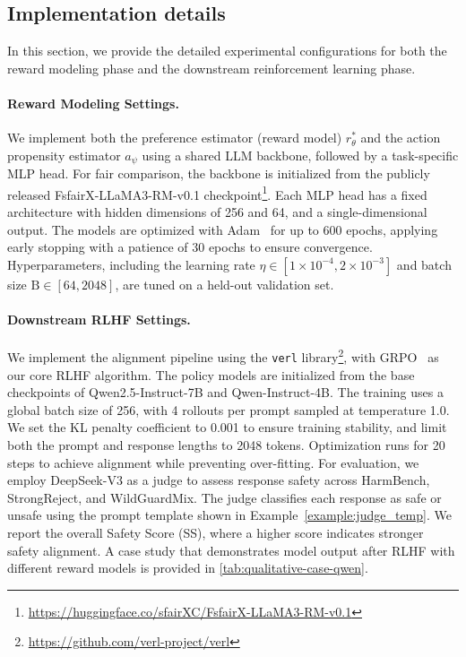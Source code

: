 \documentclass[]{arxiv_singlecolumn}
\theoremstyle{plain}
\theoremstyle{definition}
\theoremstyle{remark}
\begin{document}
\subsection{Implementation details}
\label{sec:appendix_implementation}



In this section, we provide the detailed experimental configurations for both the reward modeling phase and the downstream reinforcement learning phase.

\paragraph{Reward Modeling Settings.}
We implement both the preference estimator (reward model) $r^*_\theta$ and the action propensity estimator $\hat{a}_\psi$ using a shared LLM backbone, followed by a task-specific MLP head. For fair comparison, the backbone is initialized from the publicly released FsfairX-LLaMA3-RM-v0.1 checkpoint\footnote{\scriptsize\url{https://huggingface.co/sfairXC/FsfairX-LLaMA3-RM-v0.1}}. Each MLP head has a fixed architecture with hidden dimensions of 256 and 64, and a single-dimensional output. The models are optimized with Adam~\citep{adam} for up to 600 epochs, applying early stopping with a patience of 30 epochs to ensure convergence. Hyperparameters, including the learning rate $\eta \in [1\times 10^{-4}, 2\times 10^{-3}]$ and batch size $\mathrm{B} \in [64, 2048]$, are tuned on a held-out validation set.

\paragraph{Downstream RLHF Settings.}
We implement the alignment pipeline using the \texttt{verl} library\footnote{\url{https://github.com/verl-project/verl}}, with GRPO~\citep{guo2025deepseek} as our core RLHF algorithm. The policy models are initialized from the base checkpoints of Qwen2.5-Instruct-7B and Qwen-Instruct-4B. The training uses a global batch size of 256, with 4 rollouts per prompt sampled at temperature 1.0. We set the KL penalty coefficient to 0.001 to ensure training stability, and limit both the prompt and response lengths to 2048 tokens. Optimization runs for 20 steps to achieve alignment while preventing over-fitting.
For evaluation, we employ DeepSeek-V3 as a judge to assess response safety across HarmBench, StrongReject, and WildGuardMix. The judge classifies each response as safe or unsafe using the prompt template shown in Example~\ref{example:judge_temp}. We report the overall Safety Score (SS), where a higher score indicates stronger safety alignment. A case study that demonstrates model output after RLHF with different reward models is provided in \autoref{tab:qualitative-case-qwen}.
\end{document}
